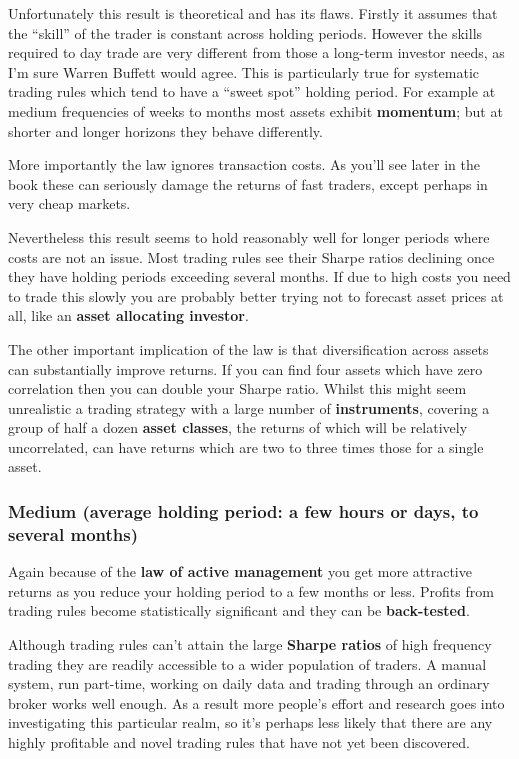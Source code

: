 Unfortunately this result is theoretical and has its flaws. Firstly it assumes that the ``skill'' of the trader is constant across holding periods. However the skills required to day trade are very different from those a long-term investor needs, as I'm sure Warren Buffett would agree. This is particularly true for systematic trading rules which tend to have a ``sweet spot'' holding period. For example at medium frequencies of weeks to months most assets exhibit \textbf{momentum}; but at shorter and longer horizons they behave differently.

More importantly the law ignores transaction costs. As you'll see later in the book these can seriously damage the returns of fast traders, except perhaps in very cheap markets.

Nevertheless this result seems to hold reasonably well for longer periods where costs are not an issue. Most trading rules see their Sharpe ratios declining once they have holding periods exceeding several months. If due to high costs you need to trade this slowly you are probably better trying not to forecast asset prices at all, like an \textbf{asset allocating investor}.

The other important implication of the law is that diversification across assets can substantially improve returns. If you can find four assets which have zero correlation then you can double your Sharpe ratio. Whilst this might seem unrealistic a trading strategy with a large number of \textbf{instruments}, covering a group of half a dozen \textbf{asset classes}, the returns of which will be relatively uncorrelated, can have returns which are two to three times those for a single asset.

\subsubsection*{Medium (average holding period: a few hours or days, to several months)}

Again because of the \textbf{law of active management} you get more attractive returns as you reduce your holding period to a few months or less. Profits from trading rules become statistically significant and they can be \textbf{back-tested}.

Although trading rules can't attain the large \textbf{Sharpe ratios} of high frequency trading they are readily accessible to a wider population of traders. A manual system, run part-time, working on daily data and trading through an ordinary broker works well enough. As a result more people's effort and research goes into investigating this particular realm, so it's perhaps less likely that there are any highly profitable and novel trading rules that have not yet been discovered.


